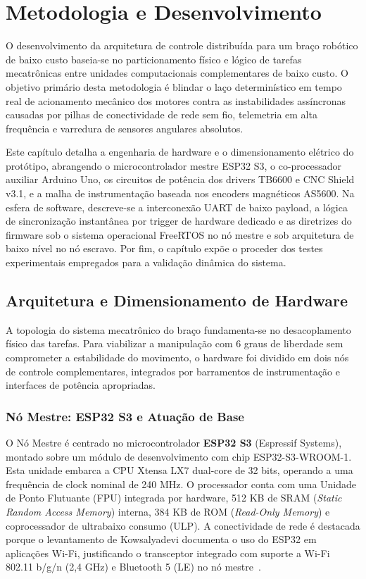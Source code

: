 \chapter{Metodologia e Desenvolvimento}
\label{cap:metodologia}

O desenvolvimento da arquitetura de controle distribuída para um braço robótico de baixo custo baseia-se no particionamento físico e lógico de tarefas mecatrônicas entre unidades computacionais complementares de baixo custo. O objetivo primário desta metodologia é blindar o laço determinístico em tempo real de acionamento mecânico dos motores contra as instabilidades assíncronas causadas por pilhas de conectividade de rede sem fio, telemetria em alta frequência e varredura de sensores angulares absolutos.

Este capítulo detalha a engenharia de hardware e o dimensionamento elétrico do protótipo, abrangendo o microcontrolador mestre ESP32 S3, o co-processador auxiliar Arduino Uno, os circuitos de potência dos drivers TB6600 e CNC Shield v3.1, e a malha de instrumentação baseada nos encoders magnéticos AS5600. Na esfera de software, descreve-se a interconexão UART de baixo payload, a lógica de sincronização instantânea por trigger de hardware dedicado e as diretrizes do firmware sob o sistema operacional FreeRTOS no nó mestre e sob arquitetura de baixo nível no nó escravo. Por fim, o capítulo expõe o proceder dos testes experimentais empregados para a validação dinâmica do sistema.

\section{Arquitetura e Dimensionamento de Hardware}
\label{sec:dimensionamento_hardware}

A topologia do sistema mecatrônico do braço fundamenta-se no desacoplamento físico das tarefas. Para viabilizar a manipulação com 6 graus de liberdade sem comprometer a estabilidade do movimento, o hardware foi dividido em dois nós de controle complementares, integrados por barramentos de instrumentação e interfaces de potência apropriadas.

\subsection{Nó Mestre: ESP32 S3 e Atuação de Base}
\label{subsec:no_mestre}

O Nó Mestre é centrado no microcontrolador \textbf{ESP32 S3} (Espressif Systems), montado sobre um módulo de desenvolvimento com chip ESP32-S3-WROOM-1. Esta unidade embarca a CPU Xtensa LX7 dual-core de 32 bits, operando a uma frequência de clock nominal de 240 MHz. O processador conta com uma Unidade de Ponto Flutuante (FPU) integrada por hardware, 512 KB de SRAM (\textit{Static Random Access Memory}) interna, 384 KB de ROM (\textit{Read-Only Memory}) e coprocessador de ultrabaixo consumo (ULP). A conectividade de rede é destacada porque o levantamento de Kowsalyadevi documenta o uso do ESP32 em aplicações Wi-Fi, justificando o transceptor integrado com suporte a Wi-Fi 802.11 b/g/n (2,4 GHz) e Bluetooth 5 (LE) no nó mestre~\cite{kowsalyadevi2025comprehensive}.

